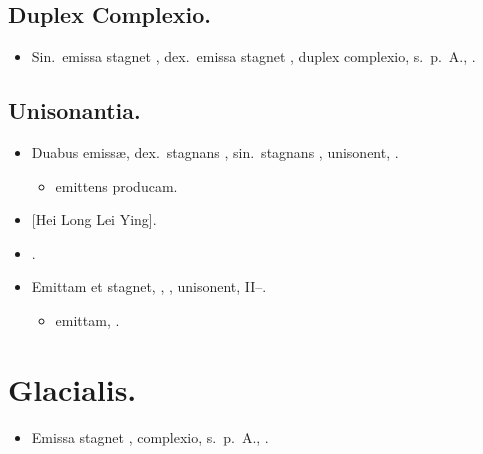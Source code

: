 \documentclass[12pt]{book}
\begin{document}
\subsection{Duplex Complexio.}\label{duplex-complexio}

\begin{itemize}
  \item Sin.\ emissa stagnet , dex.\ emissa stagnet , duplex complexio, s.~p.~A., .
\end{itemize}

\subsection{Unisonantia.}\label{unisonantia}

\begin{itemize}
  \item Duabus emissæ, dex.\ stagnans , sin.\ stagnans , unisonent, .
  \begin{itemize}
    \item \textelp{} emittens  producam.
  \end{itemize}
  \item {}[Hei Long Lei Ying].
  \item {}.
  \item Emittam et stagnet, , , unisonent,  II--.
  \begin{itemize}
    \item \textelp{} emittam, .
  \end{itemize}

\end{itemize}


\section{Glacialis.}\label{erebea-glacialis}

\begin{itemize}
  \item Emissa stagnet , complexio, s.~p.~A., .
\end{itemize}
\end{document}
